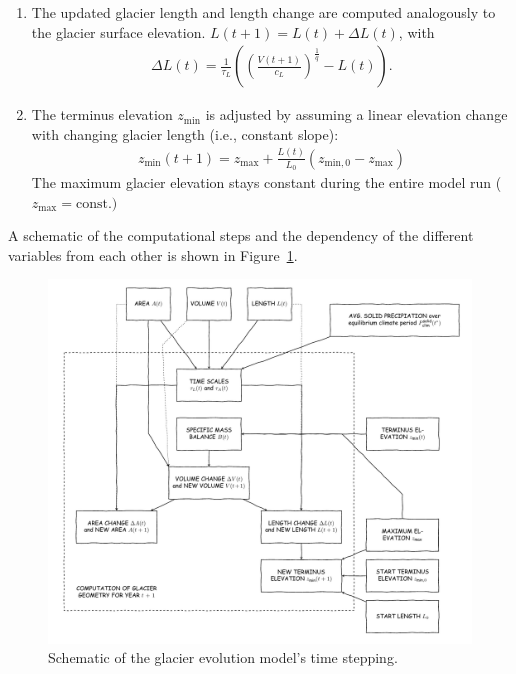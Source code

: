 \begin{enumerate}
            \item The updated glacier length and length change are computed analogously to the glacier surface elevation. $L(t+1) = L(t) + \Delta L(t)$, with
            \begin{align}
                \Delta L(t) = \frac{1}{\tau_L}\left(\left(\frac{V(t+1)}{c_L}\right)^\frac{1}{q} - L(t)\right).
            \end{align}
            \item The terminus elevation $z_\text{min}$ is adjusted by assuming a linear elevation change with changing glacier length (i.e., constant slope):
            \begin{align}
                z_\text{min}(t+1) = z_\text{max} + \frac{L(t)}{L_0}(z_{\text{min},0} - z_\text{max})
            \end{align}
            The maximum glacier elevation stays constant during the entire model run ($z_\text{max} = \text{const.})$
            
        \end{enumerate}
        A schematic of the computational steps and the dependency of the different variables from each other is shown in Figure~\ref{fig:iteration-scheme}.
        
        \begin{figure}[tbh]
            \centering
            \includegraphics[width=\textwidth]{../flowchart/iterations/scaling.pdf}
            \caption{Schematic of the glacier evolution model's time stepping.}
            \label{fig:iteration-scheme}
        \end{figure}
    
